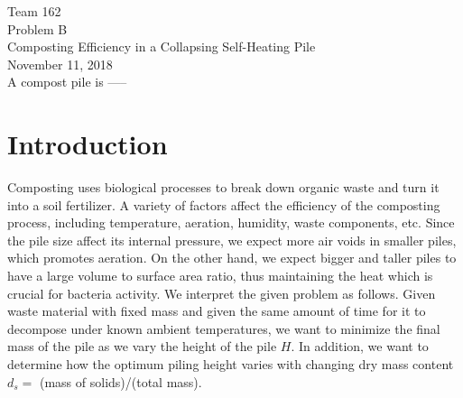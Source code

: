 \documentclass[12pt, letterpaper, titlepage]{article}
\begin{document}
\begin{titlepage}
\begin{center}
\vspace*{2.7in}
{\LARGE Team 162} \\
\vspace{0.1in}
{\Large Problem B} \\
\vspace{0.55in}
{\large Composting Efficiency in a Collapsing Self-Heating Pile} \\
\vspace{0.3in}
{\large November 11, 2018}\\
\vspace{0.55in}
{A compost pile is -----}
\end{center}
\end{titlepage}


\section{Introduction}
Composting uses biological processes to break down organic waste and turn it into a soil fertilizer. A variety of factors affect the efficiency of the composting process, including temperature, aeration, humidity, waste components, etc. Since the pile size affect its internal pressure, we expect more air voids in smaller piles, which promotes aeration. On the other hand, we expect bigger and taller piles to have a large volume to surface area ratio, thus maintaining the heat which is crucial for bacteria activity.
We interpret the given problem as follows. Given waste material with fixed mass and given the same amount of time for it to decompose under known ambient temperatures, we want to minimize the final mass of the pile as we vary the height of the pile $H$. In addition, we want to determine how the optimum piling height varies with changing dry mass content $d_{s} =$ (mass of solids)/(total mass).
\end{document}
